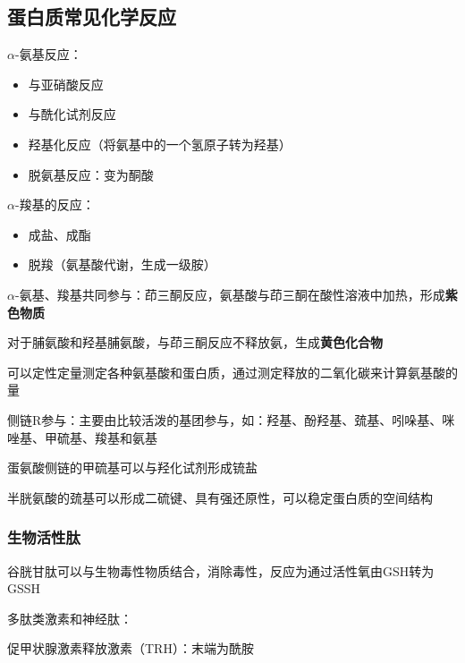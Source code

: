 \subsection{蛋白质常见化学反应}%
\label{sub:蛋白质常见化学反应}
\begin{notation}
    $\alpha$-氨基反应：
    \begin{itemize}
        \item 与亚硝酸反应
        \item 与酰化试剂反应
        \item 羟基化反应（将氨基中的一个氢原子转为羟基）
        \item 脱氨基反应：变为酮酸
    \end{itemize}
\end{notation}
\begin{notation}
    $\alpha$-羧基的反应：
    \begin{itemize}
        \item 成盐、成酯
        \item 脱羧（氨基酸代谢，生成一级胺）
    \end{itemize}
\end{notation}
\begin{notation}
    $\alpha$-氨基、羧基共同参与：茚三酮反应，氨基酸与茚三酮在酸性溶液中加热，形成\textbf{紫色物质}

    对于脯氨酸和羟基脯氨酸，与茚三酮反应不释放氨，生成\textbf{黄色化合物}

    可以定性定量测定各种氨基酸和蛋白质，通过测定释放的二氧化碳来计算氨基酸的量
\end{notation}
\begin{notation}
    侧链R参与：主要由比较活泼的基团参与，如：羟基、酚羟基、巯基、吲哚基、咪唑基、甲硫基、羧基和氨基
    \begin{eg}
        蛋氨酸侧链的甲硫基可以与羟化试剂形成锍盐
    \end{eg}
    \begin{eg}
        半胱氨酸的巯基可以形成二硫键、具有强还原性，可以稳定蛋白质的空间结构
    \end{eg}
\end{notation}
\subsubsection*{生物活性肽}%
\label{subsub*:生物活性肽}
\begin{notation}
    谷胱甘肽可以与生物毒性物质结合，消除毒性，反应为通过活性氧由GSH转为GSSH 
\end{notation}
\begin{notation}
    多肽类激素和神经肽：
    \begin{eg}
        促甲状腺激素释放激素（TRH）：末端为酰胺
    \end{eg}
\end{notation}
